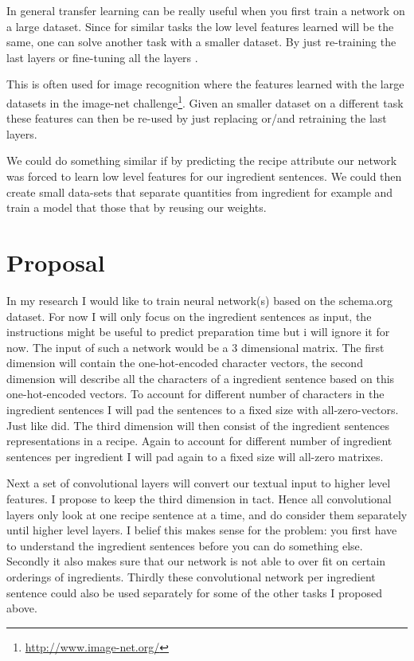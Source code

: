 \documentclass[a4paper]{scrartcl}
\begin{document}
In general transfer learning can be really useful when you first train a network on a large dataset. Since for similar tasks the low level features learned will be the same, one can solve another task with a smaller dataset. By just re-training the last layers or fine-tuning all the layers \cite{erhan2010does}. 

This is often used for image recognition where the features learned with the large datasets in the image-net challenge\footnote{\url{http://www.image-net.org/}}. Given an smaller dataset on a different task these features can then be re-used by just replacing or/and retraining the last layers. 

We could do something similar if by predicting the recipe attribute our network was forced to learn low level features for our ingredient sentences. We could then create small data-sets that separate quantities from ingredient for example and train a model that those that by reusing our weights. 
\section{Proposal}
In my research I would like to train neural network(s) based on the schema.org dataset. For now I will only focus on the ingredient sentences as input, the instructions might be useful to predict preparation time but i will ignore it for now. The input of such a network would be a 3 dimensional matrix. The first dimension will contain the one-hot-encoded character vectors, the second dimension will describe all the characters of a ingredient sentence based on this one-hot-encoded vectors.  To account for different number of characters in the ingredient sentences I will pad the sentences to a fixed size with all-zero-vectors. Just like \cite{zhang2015character} did. The third dimension will then consist of the ingredient sentences representations in a recipe. Again to account for different number of ingredient sentences per ingredient I  will pad again to a fixed size will all-zero matrixes. 


Next a set of convolutional layers will convert our textual input to higher level features. I propose to keep the third dimension in tact. Hence all convolutional layers only look at one recipe sentence at a time, and do consider them separately until  higher level layers. I belief this makes sense for the problem: you first have to understand the ingredient sentences before you can do something else. Secondly it also makes sure that our network is not able to over fit on certain orderings of ingredients. Thirdly these convolutional network per ingredient sentence could  also be used separately for some of the other tasks I proposed above. 
\end{document}
